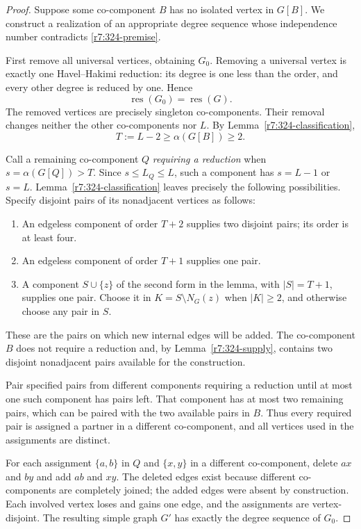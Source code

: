 \documentclass[11pt,a4paper]{article}
\theoremstyle{remark}
\begin{document}
\begin{proof}
Suppose some co-component $B$ has no isolated vertex in $G[B]$.
We construct a realization of an appropriate degree sequence whose
independence number contradicts \eqref{r7:324-premise}.

First remove all universal vertices, obtaining $G_0$.
Removing a universal vertex is exactly one Havel--Hakimi reduction:
its degree is one less than the order, and every other degree is
reduced by one.  Hence
\[
 \operatorname{res}(G_0)=\operatorname{res}(G).
\]
The removed vertices are precisely singleton co-components.  Their
removal changes neither the other co-components nor $L$.
By Lemma~\ref{r7:324-classification},
\[
 T:=L-2\ge\alpha(G[B])\ge2.
\]

Call a remaining co-component $Q$ \emph{requiring a reduction} when
$s=\alpha(G[Q])>T$.  Since $s\le L_Q\le L$, such a component has
$s=L-1$ or $s=L$.  Lemma~\ref{r7:324-classification} leaves precisely
the following possibilities.  Specify disjoint pairs of its
nonadjacent vertices as follows:
\begin{enumerate}
 \item An edgeless component of order $T+2$ supplies two disjoint
       pairs; its order is at least four.
 \item An edgeless component of order $T+1$ supplies one pair.
 \item A component $S\cup\{z\}$ of the second form in the lemma,
       with $|S|=T+1$, supplies one pair.  Choose it in
       $K=S\setminus N_G(z)$ when $|K|\ge2$, and otherwise choose
       any pair in $S$.
\end{enumerate}
These are the pairs on which new internal edges will be added.
The co-component $B$ does not require a reduction and, by
Lemma~\ref{r7:324-supply}, contains two disjoint nonadjacent pairs
available for the construction.

Pair specified pairs from different components requiring a reduction
until at most one such component has pairs left.  That component
has at most two remaining pairs, which can be paired with the two
available pairs in $B$.  Thus every required pair is assigned a
partner in a different co-component, and all vertices used in the
assignments are distinct.

For each assignment $\{a,b\}$ in $Q$ and $\{x,y\}$ in a different
co-component, delete $ax$ and $by$ and add $ab$ and $xy$.
The deleted edges exist because different co-components are
completely joined; the added edges were absent by construction.
Each involved vertex loses and gains one edge, and the assignments
are vertex-disjoint.  The resulting simple graph $G'$ has exactly
the degree sequence of $G_0$.


\end{proof}
\end{document}
